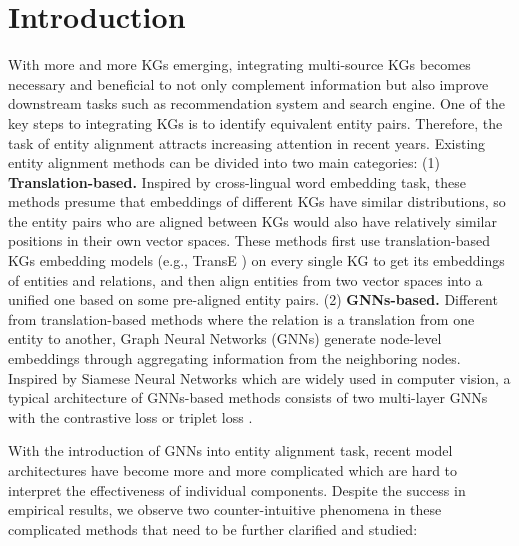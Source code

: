 \documentclass[sigconf,camera-ready]{acmart}
\begin{document}



\maketitle

\section{Introduction}
\label{sec:intro}
With more and more KGs emerging, integrating multi-source KGs becomes necessary and beneficial to not only complement information but also improve downstream tasks such as recommendation system and search engine.
One of the key steps to integrating KGs is to identify equivalent entity pairs.
Therefore, the task of entity alignment attracts increasing attention in recent years.
Existing entity alignment methods can be divided into two main categories:
(1) \textbf{Translation-based.}
Inspired by cross-lingual word embedding task, these methods presume that embeddings of different KGs have similar distributions, so the entity pairs who are aligned between KGs would also have relatively similar positions in their own vector spaces.
These methods \cite{DBLP:conf/ijcai/ChenTYZ17,DBLP:conf/semweb/SunHL17,DBLP:conf/ijcai/SunHZQ18,DBLP:conf/icml/GuoSH19} first use translation-based KGs embedding models (e.g., TransE \cite{DBLP:conf/nips/BordesUGWY13}) on every single KG to get its embeddings of entities and relations, and then align entities from two vector spaces into a unified one based on some pre-aligned entity pairs.
(2) \textbf{GNNs-based.}
Different from translation-based methods where the relation is a translation from one entity to another, Graph Neural Networks (GNNs) generate node-level embeddings through aggregating information from the neighboring nodes.
Inspired by Siamese Neural Networks \cite{DBLP:conf/cvpr/ChopraHL05} which are widely used in computer vision, a typical architecture of GNNs-based methods \cite{DBLP:conf/acl/CaoLLLLC19,sun2019knowledge,DBLP:conf/emnlp/WangLLZ18} consists of two multi-layer GNNs with the contrastive loss \cite{DBLP:conf/cvpr/HadsellCL06} or triplet loss \cite{DBLP:conf/cvpr/SchroffKP15}.

With the introduction of GNNs into entity alignment task, recent model architectures have become more and more complicated which are hard to interpret the effectiveness of individual components.
Despite the success in empirical results, we observe two counter-intuitive phenomena in these complicated methods that need to be further clarified and studied:
\end{document}
